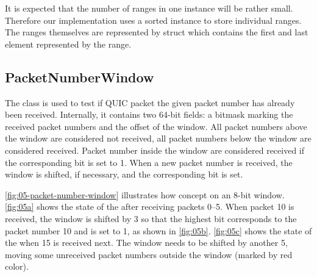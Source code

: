 It is expected that the number of ranges in one \RangeSet{} instance will be rather small. Therefore
our implementation uses a sorted  instance to store individual ranges. The ranges
themselves are represented by  struct which contains the first and last
element represented by the range.

\subsection{PacketNumberWindow}


The \PacketNumberWindow{} class is used to test if QUIC packet the given packet number has already
been received. Internally, it contains two 64-bit  fields: a bitmask marking the
received packet numbers and the offset of the window. All packet numbers above the window are
considered not received, all packet numbers below the window are considered received. Packet number
inside the window are considered received if the corresponding bit is set to 1. When a new packet
number is received, the window is shifted, if necessary, and the corresponding bit is set.

\autoref{fig:05-packet-number-window} illustrates how concept on an 8-bit window. \autoref{fig:05a}
shows the state of the \PacketNumberWindow{} after receiving packets 0--5. When packet 10 is
received, the window is shifted by 3 so that the highest bit corresponds to the packet number 10 and
is set to 1, as shown in \autoref{fig:05b}. \autoref{fig:05c} shows the state of the
\PacketNumberWindow{} when 15 is received next. The window needs to be shifted by another 5, moving
some unreceived packet numbers outside the window (marked by red color).

